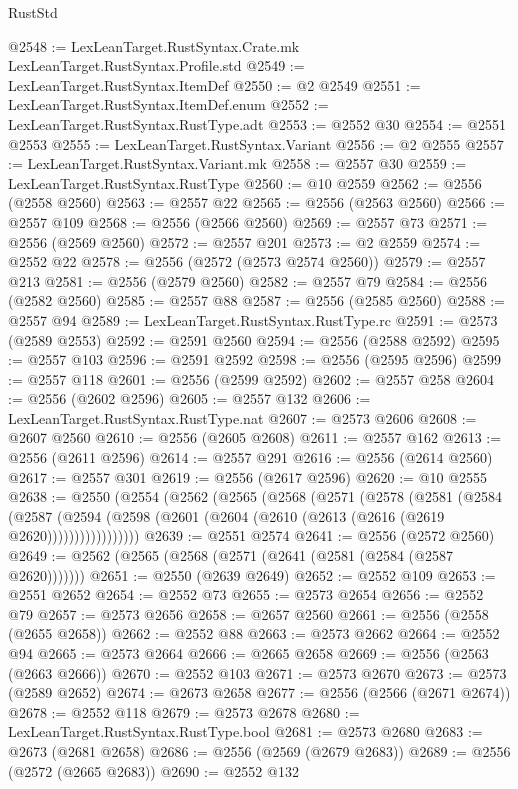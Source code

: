 \begin{lexlean}{RustStd}
\begin{coremodule}
{\begin{coremodule}
{{{{{{{{{{{{{{{{{{{{{{{{{{{{{{{{@2548 := LexLeanTarget.RustSyntax.Crate.mk LexLeanTarget.RustSyntax.Profile.std
@2549 := LexLeanTarget.RustSyntax.ItemDef
@2550 := @2 @2549
@2551 := LexLeanTarget.RustSyntax.ItemDef.enum
@2552 := LexLeanTarget.RustSyntax.RustType.adt
@2553 := @2552 @30
@2554 := @2551 @2553
@2555 := LexLeanTarget.RustSyntax.Variant
@2556 := @2 @2555
@2557 := LexLeanTarget.RustSyntax.Variant.mk
@2558 := @2557 @30
@2559 := LexLeanTarget.RustSyntax.RustType
@2560 := @10 @2559
@2562 := @2556 (@2558 @2560)
@2563 := @2557 @22
@2565 := @2556 (@2563 @2560)
@2566 := @2557 @109
@2568 := @2556 (@2566 @2560)
@2569 := @2557 @73
@2571 := @2556 (@2569 @2560)
@2572 := @2557 @201
@2573 := @2 @2559
@2574 := @2552 @22
@2578 := @2556 (@2572 (@2573 @2574 @2560))
@2579 := @2557 @213
@2581 := @2556 (@2579 @2560)
@2582 := @2557 @79
@2584 := @2556 (@2582 @2560)
@2585 := @2557 @88
@2587 := @2556 (@2585 @2560)
@2588 := @2557 @94
@2589 := LexLeanTarget.RustSyntax.RustType.rc
@2591 := @2573 (@2589 @2553)
@2592 := @2591 @2560
@2594 := @2556 (@2588 @2592)
@2595 := @2557 @103
@2596 := @2591 @2592
@2598 := @2556 (@2595 @2596)
@2599 := @2557 @118
@2601 := @2556 (@2599 @2592)
@2602 := @2557 @258
@2604 := @2556 (@2602 @2596)
@2605 := @2557 @132
@2606 := LexLeanTarget.RustSyntax.RustType.nat
@2607 := @2573 @2606
@2608 := @2607 @2560
@2610 := @2556 (@2605 @2608)
@2611 := @2557 @162
@2613 := @2556 (@2611 @2596)
@2614 := @2557 @291
@2616 := @2556 (@2614 @2560)
@2617 := @2557 @301
@2619 := @2556 (@2617 @2596)
@2620 := @10 @2555
@2638 := @2550
    (@2554
      (@2562
        (@2565
          (@2568
            (@2571
              (@2578
                (@2581
                  (@2584
                    (@2587
                      (@2594 (@2598 (@2601 (@2604 (@2610 (@2613 (@2616 (@2619 @2620)))))))))))))))))
@2639 := @2551 @2574
@2641 := @2556 (@2572 @2560)
@2649 := @2562 (@2565 (@2568 (@2571 (@2641 (@2581 (@2584 (@2587 @2620)))))))
@2651 := @2550 (@2639 @2649)
@2652 := @2552 @109
@2653 := @2551 @2652
@2654 := @2552 @73
@2655 := @2573 @2654
@2656 := @2552 @79
@2657 := @2573 @2656
@2658 := @2657 @2560
@2661 := @2556 (@2558 (@2655 @2658))
@2662 := @2552 @88
@2663 := @2573 @2662
@2664 := @2552 @94
@2665 := @2573 @2664
@2666 := @2665 @2658
@2669 := @2556 (@2563 (@2663 @2666))
@2670 := @2552 @103
@2671 := @2573 @2670
@2673 := @2573 (@2589 @2652)
@2674 := @2673 @2658
@2677 := @2556 (@2566 (@2671 @2674))
@2678 := @2552 @118
@2679 := @2573 @2678
@2680 := LexLeanTarget.RustSyntax.RustType.bool
@2681 := @2573 @2680
@2683 := @2673 (@2681 @2658)
@2686 := @2556 (@2569 (@2679 @2683))
@2689 := @2556 (@2572 (@2665 @2683))
@2690 := @2552 @132
}}}}}}}}}}}}}}}}}}}}}}}}}}}}}}}}
\end{coremodule}}
\end{coremodule}
\end{lexlean}

